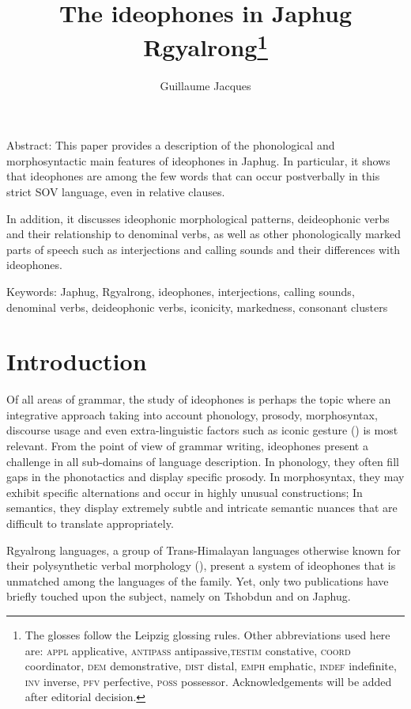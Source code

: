 \documentclass[oldfontcommands,oneside,a4paper,11pt]{article}
\begin{document}
 
 \title{The ideophones in Japhug Rgyalrong\footnote{
The glosses follow the Leipzig glossing rules. Other abbreviations used here are: \textsc{appl} applicative, \textsc{antipass} antipassive,\textsc{testim} constative, \textsc{coord} coordinator, \textsc{dem} demonstrative, \textsc{dist} distal, \textsc{emph} emphatic, \textsc{indef} indefinite, \textsc{inv} inverse,  \textsc{pfv} perfective, \textsc{poss} possessor. %
Acknowledgements will be added after editorial decision.  %
} }
\author{Guillaume Jacques}
\maketitle
\linenumbers
 
Abstract: This paper provides a   description of the phonological and morphosyntactic main features of ideophones in Japhug. In particular, it shows that ideophones are among the few words that can occur postverbally in this strict SOV language, even in relative clauses.

In addition, it discusses  ideophonic morphological patterns, deideophonic verbs and their relationship to   denominal verbs, as well as other phonologically marked parts of speech such as interjections and calling sounds and their differences with ideophones.

Keywords: Japhug, Rgyalrong, ideophones, interjections, calling sounds, denominal verbs, deideophonic verbs, iconicity, markedness, consonant clusters


 \section{Introduction}
Of all areas of grammar, the study of ideophones is perhaps the   topic where an integrative approach taking into account phonology, prosody, morphosyntax, discourse usage and even extra-linguistic factors such as iconic gesture (\citealt{dingemanse11phd}) is most relevant. From the point of view of grammar writing, ideophones present a challenge in all sub-domains of language description. In phonology, they often fill gaps in the phonotactics and display specific prosody. In morphosyntax, they may exhibit specific alternations and occur in highly unusual constructions; In semantics, they display extremely subtle and intricate semantic nuances that are   difficult to translate appropriately.


 Rgyalrong languages, a group of Trans-Himalayan languages otherwise known for their polysynthetic verbal morphology (\citealt{jacques12incorp}), present a system of ideophones that is   unmatched   among the languages of the family. Yet, only two publications have briefly touched upon the subject, namely \citet{jackson04zhuangmaoci} on Tshobdun and \citet[305-17]{jacques08zh} on Japhug. 
 
\end{document}

